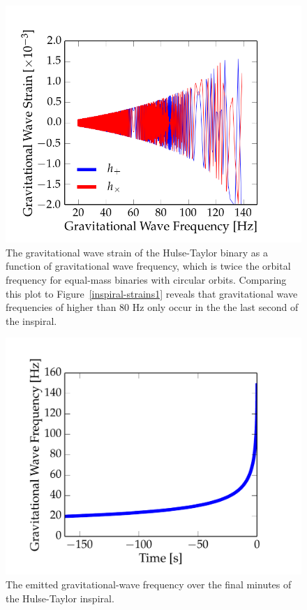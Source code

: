 \documentclass[preprint2]{aastex}
\begin{document}
\begin{figure}[t!]
\vspace{-0.24cm}
\centering
\hspace*{-1cm}\includegraphics[width=1.2\textwidth]{inspiral_figs/inspiral_strain_spectrum.png}
\caption{The gravitational wave strain of the Hulse-Taylor binary as a function of gravitational wave frequency, which is twice the orbital frequency for equal-mass binaries with circular orbits. Comparing this plot to Figure~\ref{inspiral-strains1} reveals that gravitational wave frequencies of higher than 80 Hz only occur in the the last second of the inspiral.}
\label{inspiral-strain-spectrum}
\end{figure}

\begin{figure}[t!]
\vspace{-0.24cm}
\centering
\hspace*{-1cm}\includegraphics[width=1.2\textwidth]{inspiral_figs/inspiral_freqs.pdf}
\caption{The emitted gravitational-wave frequency over the final minutes of the Hulse-Taylor inspiral.}
\label{inspiral-gw-freq}
\end{figure}
\end{document}
